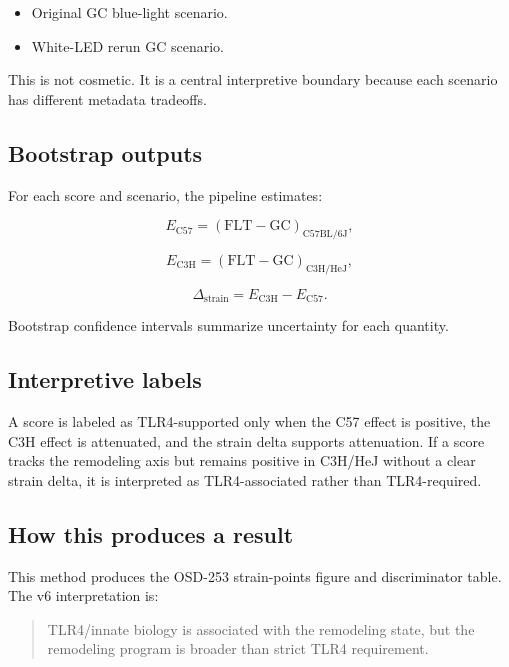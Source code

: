 \documentclass[11pt]{article}
\begin{document}
\begin{itemize}
  \item Original GC blue-light scenario.
  \item White-LED rerun GC scenario.
\end{itemize}

This is not cosmetic. It is a central interpretive boundary because each scenario has different metadata tradeoffs.

\subsection{Bootstrap outputs}

For each score and scenario, the pipeline estimates:

\begin{equation}
E_{\mathrm{C57}}=(\mathrm{FLT}-\mathrm{GC})_{\mathrm{C57BL/6J}},
\end{equation}

\begin{equation}
E_{\mathrm{C3H}}=(\mathrm{FLT}-\mathrm{GC})_{\mathrm{C3H/HeJ}},
\end{equation}

\begin{equation}
\Delta_{\mathrm{strain}}=E_{\mathrm{C3H}}-E_{\mathrm{C57}}.
\end{equation}

Bootstrap confidence intervals summarize uncertainty for each quantity.

\subsection{Interpretive labels}

A score is labeled as TLR4-supported only when the C57 effect is positive, the C3H effect is attenuated, and the strain delta supports attenuation. If a score tracks the remodeling axis but remains positive in C3H/HeJ without a clear strain delta, it is interpreted as TLR4-associated rather than TLR4-required.

\subsection{How this produces a result}

This method produces the OSD-253 strain-points figure and discriminator table. The v6 interpretation is:

\begin{quote}
TLR4/innate biology is associated with the remodeling state, but the remodeling program is broader than strict TLR4 requirement.
\end{quote}
\end{document}
